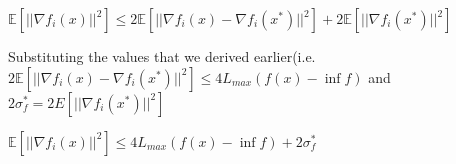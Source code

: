 \noindent $\mathbb{E}[||\nabla f_i(x)||^2] \leq 2\mathbb{E} [||\nabla f_i(x) - \nabla f_i(x^*)||^2] + 2 \mathbb{E}  [||\nabla f_i(x^*)||^2]$ \newline 

Substituting the values that we derived earlier(i.e. $2\mathbb{E}[||\nabla f_i(x) - \nabla f_i(x^*)||^2] \leq 4L_{max} (f(x) - \inf f)$ and $2 \sigma_f^* = 2 E[||\nabla f_i(x^*)||^2]$ \newline 

\noindent $\mathbb{E}[||\nabla f_i(x)||^2] \leq 4L_{max} (f(x) - \inf f) + 2 \sigma_f^*$